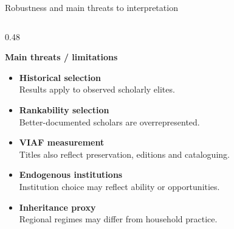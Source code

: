 \documentclass[aspectratio=169,10pt]{beamer}
\begin{document}
\begin{frame}{Robustness and main threats to interpretation}
\begin{columns}[T,onlytextwidth]
\begin{column}{0.48\textwidth}

\textbf{Main threats / limitations}

\vspace{0.10em}

\begin{itemize}
    \setlength{\itemsep}{0.20em}

    \item \textbf{Historical selection}\\[-0.08em]
    {\scriptsize Results apply to observed scholarly elites.}

    \item \textbf{Rankability selection}\\[-0.08em]
    {\scriptsize Better-documented scholars are overrepresented.}

    \item \textbf{VIAF measurement}\\[-0.08em]
    {\scriptsize Titles also reflect preservation, editions and cataloguing.}

   \item \textbf{Endogenous institutions}\\[-0.08em]
    {\scriptsize Institution choice may reflect ability or opportunities.}

    \item \textbf{Inheritance proxy}\\[-0.08em]
    {\scriptsize Regional regimes may differ from household practice.}

\end{itemize}

\end{column}

\end{columns}

\end{frame}
\end{document}
